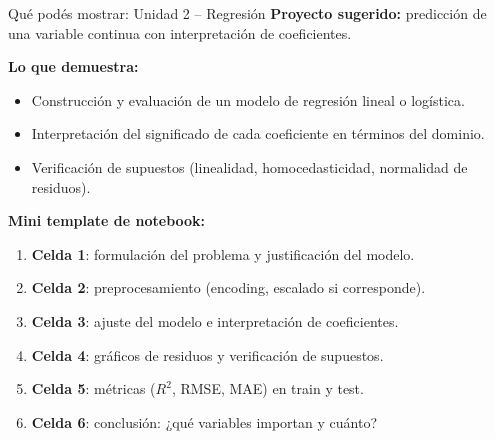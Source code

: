 \documentclass[aspectratio=169]{beamer}
\begin{document}
\begin{frame}{Qué podés mostrar: Unidad 2 -- Regresión}
  \textbf{Proyecto sugerido:} predicción de una variable continua con interpretación de coeficientes.

  \bigskip
  \textbf{Lo que demuestra:}
  \begin{itemize}
    \item Construcción y evaluación de un modelo de regresión lineal o logística.
    \item Interpretación del significado de cada coeficiente en términos del dominio.
    \item Verificación de supuestos (linealidad, homocedasticidad, normalidad de residuos).
  \end{itemize}

  \bigskip
  \textbf{Mini template de notebook:}
  \begin{enumerate}
    \item \textbf{Celda 1}: formulación del problema y justificación del modelo.
    \item \textbf{Celda 2}: preprocesamiento (encoding, escalado si corresponde).
    \item \textbf{Celda 3}: ajuste del modelo e interpretación de coeficientes.
    \item \textbf{Celda 4}: gráficos de residuos y verificación de supuestos.
    \item \textbf{Celda 5}: métricas ($R^2$, RMSE, MAE) en train y test.
    \item \textbf{Celda 6}: conclusión: ¿qué variables importan y cuánto?
  \end{enumerate}
\end{frame}
\end{document}
